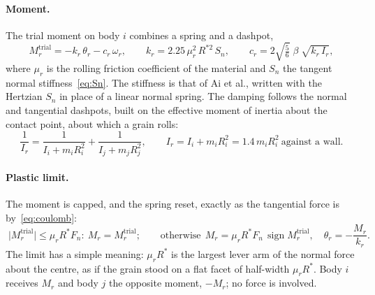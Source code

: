 \paragraph{Moment.}  The trial moment on body $i$ combines a spring and a
dashpot,
\begin{equation}
  M_{r}^{\mathrm{trial}} = -k_{r}\,\theta_{r} - c_{r}\,\omega_{r},
  \qquad
  k_{r} = 2.25\,\mu_{r}^{2}\,R^{*2}\,S_{n},
  \qquad
  c_{r} = 2\sqrt{\tfrac{5}{6}}\;\beta\;\sqrt{k_{r}\,I_{r}} ,
  \label{eq:Mr-trial}
\end{equation}
where $\mu_{r}$ is the rolling friction coefficient of the material and $S_{n}$
the tangent normal stiffness~\eqref{eq:Sn}.  The stiffness is that of Ai et
al., written with the Hertzian $S_{n}$ in place of a linear normal spring.  The
damping follows the normal and tangential dashpots, built on the effective
moment of inertia about the contact point, about which a grain rolls:
\begin{equation}
  \frac{1}{I_{r}} = \frac{1}{I_{i}+m_{i}R_{i}^{2}} + \frac{1}{I_{j}+m_{j}R_{j}^{2}},
  \qquad
  I_{r} = I_{i}+m_{i}R_{i}^{2} = 1.4\,m_{i}R_{i}^{2}\ \text{against a wall}.
\end{equation}

\paragraph{Plastic limit.}  The moment is capped, and the spring reset, exactly
as the tangential force is by~\eqref{eq:coulomb}:
\begin{equation}
  \boxed{\;
  \lvert M_{r}^{\mathrm{trial}}\rvert \le \mu_{r} R^{*} F_{n}:
    \ M_{r} = M_{r}^{\mathrm{trial}};
  \qquad
  \text{otherwise}\ \
  M_{r} = \mu_{r} R^{*} F_{n}\,\operatorname{sign}M_{r}^{\mathrm{trial}},
  \quad \theta_{r} = -\frac{M_{r}}{k_{r}} .\;}
  \label{eq:rolling-limit}
\end{equation}
The limit has a simple meaning: $\mu_{r}R^{*}$ is the largest lever arm of the
normal force about the centre, as if the grain stood on a flat facet of
half-width $\mu_{r}R^{*}$.  Body $i$ receives $M_{r}$ and body $j$ the opposite
moment, $-M_{r}$; no force is involved.

